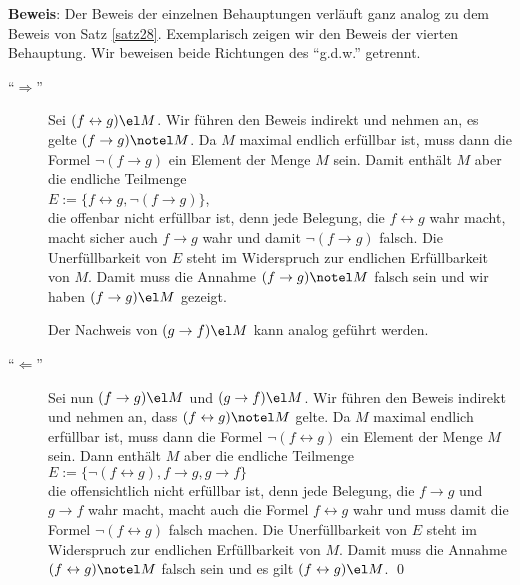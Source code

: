 \noindent
\textbf{Beweis}:  Der Beweis der einzelnen Behauptungen verl\"{a}uft ganz analog zu dem Beweis
von Satz \ref{satz28}.  Exemplarisch zeigen wir den Beweis der vierten Behauptung.
Wir beweisen beide  Richtungen des ``g.d.w.'' getrennt.
\begin{description}
\item[``$\Rightarrow$''] Sei $(f \leftrightarrow g) \el M$.  Wir f\"{u}hren den Beweis indirekt und
  nehmen an, es gelte $(f \rightarrow g) \notel M$. Da
  $M$ maximal endlich erf\"{u}llbar ist, muss dann die Formel $\neg (f \rightarrow g)$ ein Element der Menge
  $M$ sein.  Damit enth\"{a}lt $M$ aber die endliche Teilmenge 
  \\[0.2cm]
  \hspace*{1.3cm}
  $E := \{ f \leftrightarrow g, \neg (f \rightarrow g)\}$, 
  \\[0.2cm]
  die offenbar nicht erf\"{u}llbar ist, denn jede Belegung, die $f \leftrightarrow g$ wahr macht, macht
  sicher auch $f \rightarrow g$ wahr und damit $\neg (f \rightarrow g)$ falsch.  Die
  Unerf\"{u}llbarkeit von $E$ steht im 
  Widerspruch zur endlichen Erf\"{u}llbarkeit von $M$.  Damit muss die Annahme $(f \rightarrow g) \notel M$
  falsch sein und wir haben $(f \rightarrow g) \el M$ gezeigt. 

  Der Nachweis von $(g \rightarrow f) \el M$ kann analog gef\"{u}hrt werden.
\item[``$\Leftarrow$''] Sei nun $(f \rightarrow g) \el M$ und $(g \rightarrow f) \el M$.  
  Wir f\"{u}hren den Beweis indirekt und nehmen an, dass $(f \leftrightarrow g) \notel M$ gelte.  Da $M$
  maximal endlich erf\"{u}llbar ist, muss dann die Formel $\neg (f \leftrightarrow g)$ ein Element der
  Menge $M$ sein.  Dann enth\"{a}lt $M$ aber die endliche Teilmenge
  \\[0.2cm]
  \hspace*{1.3cm}
  $E := \{ \neg (f \leftrightarrow g), f \rightarrow g, g \rightarrow f \}$
  \\[0.2cm]
  die offensichtlich nicht erf\"{u}llbar ist, denn jede Belegung, die $f \rightarrow g$ und $g
  \rightarrow f$ wahr macht,
  macht auch die Formel $f \leftrightarrow g$ wahr und muss damit die Formel $\neg (f \leftrightarrow g)$
  falsch machen.  Die Unerf\"{u}llbarkeit von $E$ steht im Widerspruch zur endlichen
  Erf\"{u}llbarkeit von $M$.  Damit muss die Annahme $(f \leftrightarrow g) \notel M$ falsch sein und
  es gilt $(f \leftrightarrow g) \el M$. \qed
\end{description}

